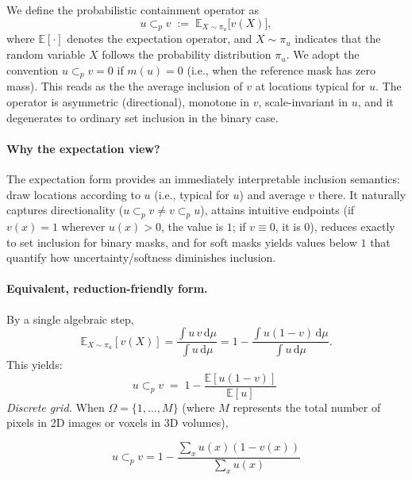 \documentclass[review,journal]{vgtc}              %
\begin{document}
We define the probabilistic containment operator as
\begin{equation}
u\subset_{\!p}v \;:=\; \mathbb{E}_{X\sim \pi_u}\!\big[v(X)\big],
\label{eq:expectation_form}
\end{equation}
where $\mathbb{E}[\cdot]$ denotes the expectation operator, and $X\sim \pi_u$ indicates that the random variable $X$ follows the probability distribution $\pi_u$. We adopt the convention $u\subset_{\!p}v=0$ if $m(u)=0$ (i.e., when the reference mask has zero mass).
This reads as the the average inclusion of $v$ at locations typical for $u$.
The operator is asymmetric (directional), monotone in $v$, scale-invariant in $u$, and it degenerates to ordinary set inclusion in the binary case.

\paragraph{Why the expectation view?}
The expectation form provides an immediately interpretable inclusion semantics: draw locations according to $u$ (i.e., typical for $u$) and average $v$ there.
It naturally captures directionality ($u\subset_{\!p}v \neq v\subset_{\!p}u$), attains intuitive endpoints (if $v(x)=1$ wherever $u(x)>0$, the value is $1$; if $v\equiv 0$, it is $0$), reduces exactly to set inclusion for binary masks, and for soft masks yields values below $1$ that quantify how uncertainty/softness diminishes inclusion.

\paragraph{Equivalent, reduction-friendly form.}
By a single algebraic step,
\begin{equation}
\mathbb{E}_{X\sim \pi_u}[v(X)]
=\frac{\int u\,v\,\mathrm d\mu}{\int u\,\mathrm d\mu}
=1-\frac{\int u(1-v)\,\mathrm d\mu}{\int u\,\mathrm d\mu}.
\end{equation}
This yields:
\begin{equation}
u \subset_{\!p} v \;=\; 
1-\frac{\mathbb{E}[u(1-v)]}{\mathbb{E}[u]}
\;
\label{eq:prob_contain}
\end{equation}
\noindent\emph{Discrete grid.}
When $\Omega=\{1,\ldots,M\}$ (where $M$ represents the total number of pixels in 2D images or voxels in 3D volumes),

\begin{equation}
u\subset_{\!p}v=1-\frac{\sum_x u(x)(1-v(x))}{\sum_x u(x)}
\end{equation}
\end{document}
